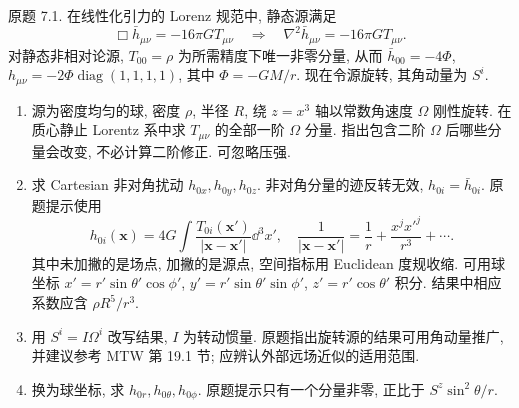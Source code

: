 \begin{exercise}
原题 7.1. 在线性化引力的 Lorenz 规范中, 静态源满足
\[
\Box\bar h_{\mu\nu}=-16\pi GT_{\mu\nu}
\quad\Longrightarrow\quad
\nabla^2\bar h_{\mu\nu}=-16\pi GT_{\mu\nu}.
\]
对静态非相对论源, $T_{00}=\rho$ 为所需精度下唯一非零分量, 从而 $\bar h_{00}=-4\Phi$, $h_{\mu\nu}=-2\Phi\operatorname{diag}(1,1,1,1)$, 其中 $\Phi=-GM/r$. 现在令源旋转, 其角动量为 $S^i$.
\begin{enumerate}[label=(\alph*)]
\item 源为密度均匀的球, 密度 $\rho$, 半径 $R$, 绕 $z=x^3$ 轴以常数角速度 $\Omega$ 刚性旋转. 在质心静止 Lorentz 系中求 $T_{\mu\nu}$ 的全部一阶 $\Omega$ 分量. 指出包含二阶 $\Omega$ 后哪些分量会改变, 不必计算二阶修正. 可忽略压强.
\item 求 Cartesian 非对角扰动 $h_{0x},h_{0y},h_{0z}$. 非对角分量的迹反转无效, $h_{0i}=\bar h_{0i}$. 原题提示使用
\[
h_{0i}(\boldsymbol x)=4G\int\frac{T_{0i}(\boldsymbol x')}{|\boldsymbol x-\boldsymbol x'|}\dd^3x',
\quad
\frac1{|\boldsymbol x-\boldsymbol x'|}=\frac1r+\frac{x^jx'^j}{r^3}+\cdots.
\]
其中未加撇的是场点, 加撇的是源点, 空间指标用 Euclidean 度规收缩. 可用球坐标 $x'=r'\sin\theta'\cos\phi'$, $y'=r'\sin\theta'\sin\phi'$, $z'=r'\cos\theta'$ 积分. 结果中相应系数应含 $\rho R^5/r^3$.
\item 用 $S^i=I\Omega^i$ 改写结果, $I$ 为转动惯量. 原题指出旋转源的结果可用角动量推广, 并建议参考 MTW 第 19.1 节; 应辨认外部远场近似的适用范围.
\item 换为球坐标, 求 $h_{0r},h_{0\theta},h_{0\phi}$. 原题提示只有一个分量非零, 正比于 $S^z\sin^2\theta/r$.
\end{enumerate}
\end{exercise}
